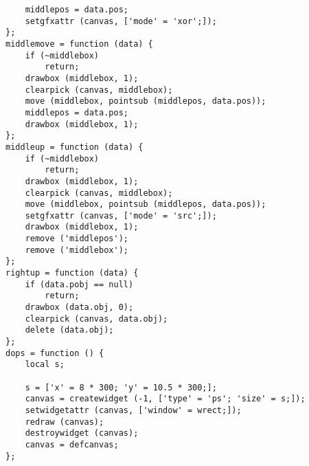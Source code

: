 \begin{verbatim}
    middlepos = data.pos;
    setgfxattr (canvas, ['mode' = 'xor';]);
};
middlemove = function (data) {
    if (~middlebox)
        return;
    drawbox (middlebox, 1);
    clearpick (canvas, middlebox);
    move (middlebox, pointsub (middlepos, data.pos));
    middlepos = data.pos;
    drawbox (middlebox, 1);
};
middleup = function (data) {
    if (~middlebox)
        return;
    drawbox (middlebox, 1);
    clearpick (canvas, middlebox);
    move (middlebox, pointsub (middlepos, data.pos));
    setgfxattr (canvas, ['mode' = 'src';]);
    drawbox (middlebox, 1);
    remove ('middlepos');
    remove ('middlebox');
};
rightup = function (data) {
    if (data.pobj == null)
        return;
    drawbox (data.obj, 0);
    clearpick (canvas, data.obj);
    delete (data.obj);
};
dops = function () {
    local s;

    s = ['x' = 8 * 300; 'y' = 10.5 * 300;];
    canvas = createwidget (-1, ['type' = 'ps'; 'size' = s;]);
    setwidgetattr (canvas, ['window' = wrect;]);
    redraw (canvas);
    destroywidget (canvas);
    canvas = defcanvas;
};
\end{verbatim}
